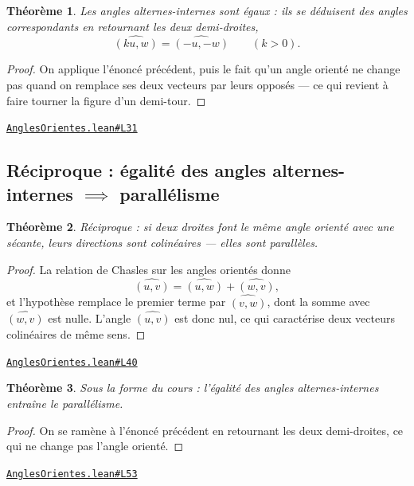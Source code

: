 \documentclass[11pt,a4paper]{article}
\theoremstyle{definition}
\theoremstyle{plain}
\newtheorem{theoreme}{Théorème}
\newcommand{\source}[2]{\par\smallskip\noindent\hfill{\footnotesize\href{#1}{\texttt{#2}}}\par\smallskip}
\begin{document}
\begin{theoreme}
Les \emph{angles alternes-internes} sont égaux : ils se déduisent des angles
correspondants en retournant les deux demi-droites,
\[ \widehat{(ku, w)} = \widehat{(-u, -w)} \qquad (k > 0) . \]
\end{theoreme}

\begin{proof}
On applique l'énoncé précédent, puis le fait qu'un angle orienté ne change pas quand on
remplace ses deux vecteurs par leurs opposés — ce qui revient à faire tourner la figure
d'un demi-tour.
\end{proof}
\source{https://github.com/Commutator-IO/learn-lean/blob/main/cours/01-college/02-geometrie-plane/AnglesOrientes.lean\#L31}{AnglesOrientes.lean\#L31}

\subsection{Réciproque : égalité des angles alternes-internes \(\implies\) parallélisme}

\begin{theoreme}
Réciproque : si deux droites font le même angle orienté avec une sécante, leurs
directions sont colinéaires — elles sont parallèles.
\end{theoreme}

\begin{proof}
La relation de Chasles sur les angles orientés donne
\[ \widehat{(u, v)} = \widehat{(u, w)} + \widehat{(w, v)} , \]
et l'hypothèse remplace le premier terme par $\widehat{(v, w)}$, dont la somme avec
$\widehat{(w, v)}$ est nulle. L'angle $\widehat{(u, v)}$ est donc nul, ce qui caractérise
deux vecteurs colinéaires de même sens.
\end{proof}
\source{https://github.com/Commutator-IO/learn-lean/blob/main/cours/01-college/02-geometrie-plane/AnglesOrientes.lean\#L40}{AnglesOrientes.lean\#L40}

\begin{theoreme}
Sous la forme du cours : l'égalité des angles alternes-internes entraîne le
parallélisme.
\end{theoreme}

\begin{proof}
On se ramène à l'énoncé précédent en retournant les deux demi-droites, ce qui ne change
pas l'angle orienté.
\end{proof}
\source{https://github.com/Commutator-IO/learn-lean/blob/main/cours/01-college/02-geometrie-plane/AnglesOrientes.lean\#L53}{AnglesOrientes.lean\#L53}
\end{document}

